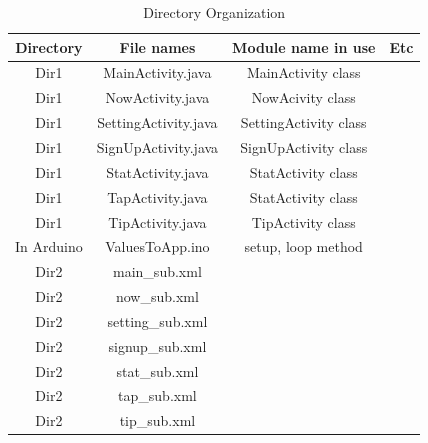 \documentclass[conference]{IEEEtran}
\begin{document}
\begin{table}[H]
\caption{Directory Organization}
\begin{tabular}{|c|c|c|c|}\hline

Directory & File names & Module name in use & Etc \\ \hline \hline

Dir1 & MainActivity.java & MainActivity class & \\ \hline 

Dir1& NowActivity.java & NowAcivity class & \\ \hline 

Dir1 & SettingActivity.java & SettingActivity class & \\ \hline 

Dir1 & SignUpActivity.java & SignUpActivity class & \\  \hline 

Dir1 & StatActivity.java & StatActivity class & \\ \hline 

Dir1& TapActivity.java & StatActivity class & \\ \hline 

Dir1 & TipActivity.java & TipActivity class & \\ \hline 

In Arduino & ValuesToApp.ino & setup, loop method & \\ \hline  

Dir2& main\_{}sub.xml & & \\ \hline 

Dir2& now\_{}sub.xml & &  \\ \hline

Dir2& setting\_{}sub.xml & & \\ \hline 

Dir2 & signup\_{}sub.xml & & \\ \hline 

Dir2 & stat\_{}sub.xml & & \\ \hline 

Dir2 & tap\_{}sub.xml & & \\ \hline

Dir2 & tip\_{}sub.xml & & \\ \hline
\end{tabular}\\\\\\\\

\end{table}
\end{document}
